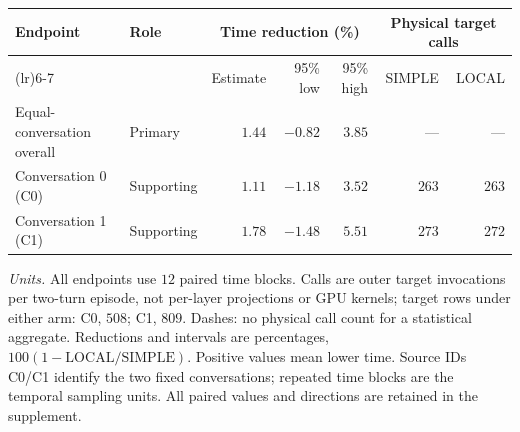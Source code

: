 \begingroup
\fontsize{8.7}{10.5}\selectfont
\setlength{\tabcolsep}{3.0pt}\renewcommand{\arraystretch}{1.03}
\noindent
\begin{tabularx}{\linewidth}{@{}>{\raggedright\arraybackslash}Xlrrrrr@{}}
\toprule
Endpoint & Role & \multicolumn{3}{c}{Time reduction (\%)} & \multicolumn{2}{c}{Physical target calls}\\
\cmidrule(lr){3-5}\cmidrule(lr){6-7}
 &  & Estimate & 95\% low & 95\% high & SIMPLE & LOCAL\\
\midrule
Equal-conversation overall & Primary & $1.44$ & $-0.82$ & $3.85$ & --- & ---\\
\midrule
Conversation 0 (C0) & Supporting & $1.11$ & $-1.18$ & $3.52$ & $263$ & $263$\\
Conversation 1 (C1) & Supporting & $1.78$ & $-1.48$ & $5.51$ & $273$ & $272$\\
\bottomrule
\end{tabularx}
\par\smallskip
\fontsize{8}{9.6}\selectfont\raggedright
\textit{Units.} All endpoints use $12$ paired time blocks. Calls are outer target invocations per two-turn episode, not per-layer projections or GPU kernels; target rows under either arm: C0, $508$; C1, $809$. Dashes: no physical call count for a statistical aggregate. Reductions and intervals are percentages, $100(1-\mathrm{LOCAL/SIMPLE})$. Positive values mean lower time. Source IDs C0/C1 identify the two fixed conversations; repeated time blocks are the temporal sampling units. All paired values and directions are retained in the supplement.
\par\endgroup
